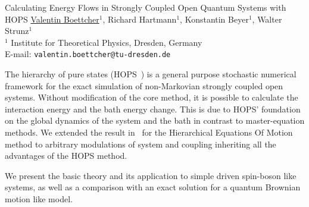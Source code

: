 \documentclass[fontsize=12pt,paper=a4,
captions=nooneline,captions=tableabove,english,final,parskip=none,titlepage=false]{scrartcl}
\begin{document}
\begin{center}
  \Large
  Calculating Energy Flows in Strongly Coupled Open Quantum Systems with
  HOPS
  \vspace{16pt}
  \small \underline{Valentin Boettcher}$^1$, Richard Hartmann$^1$,
  Konstantin Beyer$^1$, Walter Strunz$^1$
  \\
  $^1$ Institute for Theoretical Physics, Dresden, Germany\\
  E-mail: \texttt{valentin.boettcher@tu-dresden.de}\\
  \vspace{8pt}
\end{center}
\normalsize
The hierarchy of pure states
(HOPS~\cite{Hartmann2017Dec,Diosi1998Mar}) is a general purpose
stochastic numerical framework for the exact simulation of
non-Markovian strongly coupled open systems. Without modification of
the core method, it is possible to calculate the interaction energy
and the bath energy change. This is due to HOPS' foundation on the
global dynamics of the system and the bath in contrast to
master-equation methods. We extended the result in~\cite{Kato2016Dec}
for the Hierarchical Equations Of Motion method to arbitrary
modulations of system and coupling inheriting all the advantages of
the HOPS method.

We present the basic theory and its application to simple driven
spin-boson like systems, as well as a comparison with an exact
solution for a quantum Brownian motion like model.
\begin{figure}[H]
  \centering
  {}
\end{figure}
\printbibliography{}
\end{document}
